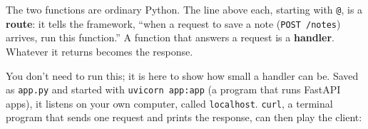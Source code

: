 \begin{codeblock}

\begin{Shaded}
\begin{Highlighting}[]

\OperatorTok{=}
\OperatorTok{=}\NormalTok{ []  }

\NormalTok{(}\NormalTok{)}
\NormalTok{):}
\NormalTok{    notes.append(note[}\NormalTok{])}
    \NormalTok{ \{}\NormalTok{: }\NormalTok{, }\NormalTok{: }

\NormalTok{(}\NormalTok{)}
    \NormalTok{ \{}
\end{Highlighting}
\end{Shaded}

\end{codeblock}

The two functions are ordinary Python. The line above each, starting with \texttt{@}, is a \textbf{route}: it tells the framework, ``when a request to save a note (\texttt{POST\ /notes}) arrives, run this function.'' A function that answers a request is a \textbf{handler}. Whatever it returns becomes the response.

You don't need to run this; it is here to show how small a handler can be. Saved as \texttt{app.py} and started with \texttt{uvicorn\ app:app} (a program that runs FastAPI apps), it listens on your own computer, called \texttt{localhost}. \texttt{curl}, a terminal program that sends one request and prints the response, can then play the client:

\begin{codeblock}

\begin{Shaded}
\begin{Highlighting}[]
 \DataTypeTok{\textbackslash{}}
    \DataTypeTok{\textbackslash{}}
   
\end{Highlighting}
\end{Shaded}

\end{codeblock}

